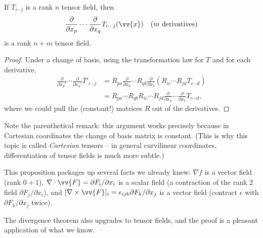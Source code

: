 \begin{proposition}
	If $T_{i \cdots j}$ is a rank $n$ tensor field, then
	$$
	\frac{\partial}{\partial x_p} \cdots \frac{\partial}{\partial x_q} T_{i\cdots j}(\vv{x}) \quad (m \text{ derivatives})
	$$
	is a rank $n + m$ tensor field.
\end{proposition}
\begin{proof}
	Under a change of basis, using the transformation law for $T$ and for each derivative,
	\begin{align*}
		\frac{\partial}{\partial x_p'} \cdots \frac{\partial}{\partial x_q'} T'_{i \cdots j} &= R_{pa}\frac{\partial}{\partial x_a} \cdots R_{qb} \frac{\partial}{\partial x_b} \left(R_{ic} \cdots R_{jd} T_{c \cdots d}\right) \\
		&= R_{pa}\cdots R_{qb} R_{ic}\cdots R_{jd} \frac{\partial}{\partial x_a}\cdots\frac{\partial}{\partial x_b}T_{c\cdots d},
	\end{align*}
	where we could pull the (constant!) matrices $R$ out of the derivatives.
\end{proof}

Note the parenthetical remark: this argument works precisely because in Cartesian coordinates the change of basis matrix is constant. (This is why this topic is called \emph{Cartesian} tensors -- in general curvilinear coordinates, differentiation of tensor fields is much more subtle.)

This proposition packages up several facts we already knew: $\nabla f$ is a vector field (rank $0 + 1$), $\nabla \cdot \vv{F} = \partial F_i/\partial x_i$ is a scalar field (a contraction of the rank $2$ field $\partial F_j / \partial x_i$), and $[\nabla \times \vv{F}]_i = \epsilon_{ijk}\partial F_k/\partial x_j$ is a vector field (contract $\epsilon$ with $\partial F_k/\partial x_j$ twice).

The divergence theorem also upgrades to tensor fields, and the proof is a pleasant application of what we know.

